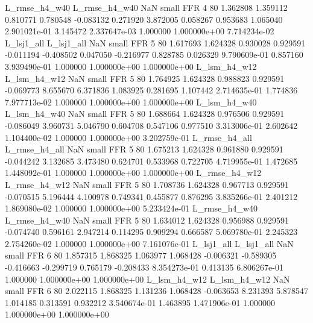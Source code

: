 L_rmse_h4_w40 L_rmse_h4_w40                   NaN      small      FFR                 4 80 1.362808       1.359112 0.810771       0.780548   -0.083132      0.271920      3.872005     0.058267       0.953683  1.065040 2.901021e-01     3.145472   2.337647e-03            1.000000    1.000000e+00        7.714234e-02
   L_lsj1_all    L_lsj1_all                   NaN      small      FFR                 5 80 1.617693       1.624328 0.930028       0.929591   -0.011194     -0.408502      0.047050    -0.216977       0.828785  0.026329 9.790609e-01     0.857160   3.939490e-01            1.000000    1.000000e+00        1.000000e+00
 L_lsm_h4_w12  L_lsm_h4_w12                   NaN      small      FFR                 5 80 1.764925       1.624328 0.988823       0.929591   -0.069773      8.655670      6.371836     1.083925       0.281695  1.107442 2.714635e-01     1.774836   7.977713e-02            1.000000    1.000000e+00        1.000000e+00
 L_lsm_h4_w40  L_lsm_h4_w40                   NaN      small      FFR                 5 80 1.688664       1.624328 0.976506       0.929591   -0.086049      3.960731      5.046790     0.604708       0.547106  0.977510 3.313006e-01     2.602642   1.104400e-02            1.000000    1.000000e+00        3.202759e-01
L_rmse_h4_all L_rmse_h4_all                   NaN      small      FFR                 5 80 1.675213       1.624328 0.961880       0.929591   -0.044242      3.132685      3.473480     0.624701       0.533968  0.722705 4.719955e-01     1.472685   1.448092e-01            1.000000    1.000000e+00        1.000000e+00
L_rmse_h4_w12 L_rmse_h4_w12                   NaN      small      FFR                 5 80 1.708736       1.624328 0.967713       0.929591   -0.070515      5.196444      4.100978     0.749341       0.455877  0.876295 3.835266e-01     2.401212   1.869080e-02            1.000000    1.000000e+00        5.233424e-01
L_rmse_h4_w40 L_rmse_h4_w40                   NaN      small      FFR                 5 80 1.634012       1.624328 0.956988       0.929591   -0.074740      0.596161      2.947214     0.114295       0.909294  0.666587 5.069780e-01     2.245323   2.754260e-02            1.000000    1.000000e+00        7.161076e-01
   L_lsj1_all    L_lsj1_all                   NaN      small      FFR                 6 80 1.857315       1.868325 1.063977       1.068428   -0.006321     -0.589305     -0.416663    -0.299719       0.765179 -0.208433 8.354273e-01     0.413135   6.806267e-01            1.000000    1.000000e+00        1.000000e+00
 L_lsm_h4_w12  L_lsm_h4_w12                   NaN      small      FFR                 6 80 2.022115       1.868325 1.131236       1.068428   -0.063653      8.231393      5.878547     1.014185       0.313591  0.932212 3.540674e-01     1.463895   1.471906e-01            1.000000    1.000000e+00        1.000000e+00
